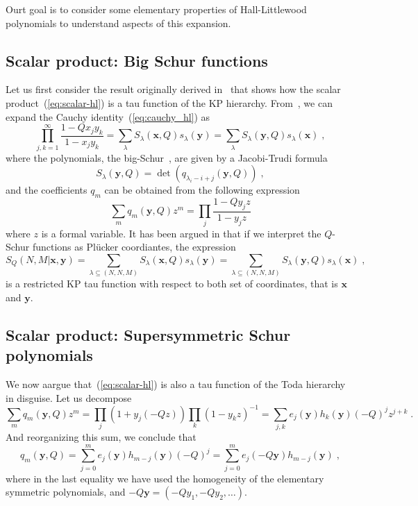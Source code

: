 \documentclass[a4paper,11pt]{amsart}
\begin{document}
Ourt goal is to consider some elementary properties of Hall-Littlewood polynomials 
to understand aspects of this expansion. 

\subsection{Scalar product: Big Schur functions}

Let us first consider the result originally derived
in~\cite{Foda:2008hn} that shows how the scalar
product~(\ref{eq:scalar-hl}) is a tau function of the KP hierarchy.
From~\cite[see chap.3, sec. 4, eq. (4.7)]{Macdonald:1998}, we can
expand the Cauchy identity~(\ref{eq:cauchy_hl}) as
\begin{equation}
 \prod_{j, k=1}^\infty \frac{1-Q x_j y_k}{1 - x_j y_k} = 
\sum_{\lambda} S_{\lambda}(\bm{x}, Q) s_{\lambda}(\bm{y}) =
\sum_{\lambda} S_{\lambda}(\bm{y}, Q) s_{\lambda}(\bm{x}) \; ,
\end{equation}
where the polynomials, the big-Schur~\cite{Wheeler:2018}, are given by 
a Jacobi-Trudi formula
\begin{equation}
  S_{\lambda} (\bm{y}, Q) = \det(q_{\lambda_i -i + j}(\bm{y}, Q))\; , 
\end{equation}
and the coefficients \(q_m\) can be obtained from the following expression
\begin{equation}
 \sum_{m} q_m(\bm{y}, Q) z^m =
 \prod_{j} \frac{1-Q y_j z}{1 - y_j z}
\end{equation}
where \(z\) is a formal variable. It has been argued in that if we
interpret the \(Q\)-Schur functions as Plücker coordiantes, the
expression
\begin{equation}
  S_Q(N,M | \bm{x}, \bm{y})
  = \sum_{\lambda \subseteq (N,N,M)} S_{\lambda}(\bm{x}, Q) s_{\lambda}(\bm{y})
  = \sum_{\lambda \subseteq (N,N,M)} S_{\lambda}(\bm{y}, Q) s_{\lambda}(\bm{x})\; ,
\end{equation}
is a restricted KP tau function with respect to both set of coordinates,
that is \(\bm{x}\) and \(\bm{y}\).


\subsection{Scalar product: Supersymmetric Schur polynomials}

We now aargue that~(\ref{eq:scalar-hl}) is also a tau function of the
Toda hierarchy in disguise. Let us decompose 
\begin{equation}
 \sum_{m} q_m(\bm{y}, Q) z^m =
 \prod_j (1 + y_j (-Q z)) \prod_k (1 - y_k z)^{-1} = 
 \sum_{j, k} e_j(\bm{y}) h_k(\bm{y}) (- Q)^j z^{j+k}\; .
\end{equation}
And reorganizing this sum, we conclude that 
\begin{equation}
  q_m(\bm{y}, Q)  = \sum_{j=0}^m e_j(\bm{y}) h_{m-j}(\bm{y}) (- Q)^j =
 \sum_{j=0}^m e_j(-Q\bm{y}) h_{m-j}(\bm{y}) \; ,
\end{equation}
where in the last equality we have used the homogeneity of the elementary symmetric polynomials,
and \( -Q\bm{y} = (-Qy_1, -Qy_2, \dots)\). 
\end{document}
